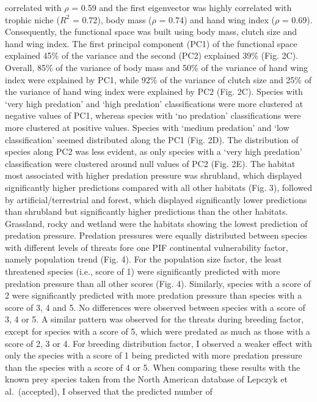 \documentclass[
  super,
  review,
  3p]{elsarticle}
\begin{document}
correlated with \(\rho\) = 0.59 and the first eigenvector was highly
correlated with trophic niche (\(R^{2}\) = 0.72), body mass (\(\rho\) =
0.74) and hand wing index (\(\rho\) = 0.69). Consequently, the
functional space was built using body mass, clutch size and hand wing
index. The first principal component (PC1) of the functional space
explained 45\% of the variance and the second (PC2) explained 39\% (Fig.
2C). Overall, 85\% of the variance of body mass and 50\% of the variance
of hand wing index were explained by PC1, while 92\% of the variance of
clutch size and 25\% of the variance of hand wing index were explained
by PC2 (Fig. 2C). Species with `very high predation' and `high
predation' classifications were more clustered at negative values of
PC1, whereas species with `no predation' classifications were more
clustered at positive values. Species with `medium predation' and `low
classification' seemed distributed along the PC1 (Fig. 2D). The
distribution of species along PC2 was less evident, as only species with
a `very high predation' classification were clustered around null values
of PC2 (Fig. 2E). The habitat most associated with higher predation
pressure was shrubland, which displayed significantly higher predictions
compared with all other habitats (Fig. 3), followed by
artificial/terrestrial and forest, which displayed significantly lower
predictions than shrubland but significantly higher predictions than the
other habitats. Grassland, rocky and wetland were the habitats showing
the lowest prediction of predation pressure. Predation pressures were
equally distributed between species with different levels of threats
fore one PIF continental vulnerability factor, namely population trend
(Fig. 4). For the population size factor, the least threatened species
(i.e., score of 1) were significantly predicted with more predation
pressure than all other scores (Fig. 4). Similarly, species with a score
of 2 were significantly predicted with more predation pressure than
species with a score of 3, 4 and 5. No differences were observed between
species with a score of 3, 4 or 5. A similar pattern was observed for
the threats during breeding factor, except for species with a score of
5, which were predated as much as those with a score of 2, 3 or 4. For
breeding distribution factor, I observed a weaker effect with only the
species with a score of 1 being predicted with more predation pressure
than the species with a score of 4 or 5. When comparing these results
with the known prey species taken from the North American database of
Lepczyk et al.~(accepted), I observed that the predicted number of
\end{document}
